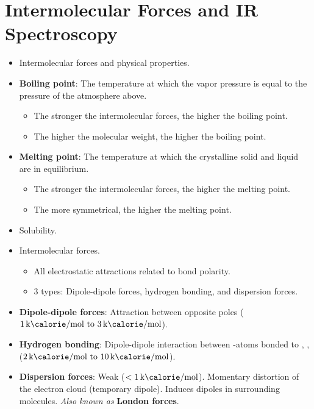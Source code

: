 \documentclass[../notes.tex]{subfiles}
\begin{document}
\section{Intermolecular Forces and IR Spectroscopy}
\begin{itemize}
    \item {}Intermolecular forces and physical properties.
    \item \textbf{Boiling point}: The temperature at which the vapor pressure is equal to the pressure of the atmosphere above.
    \begin{itemize}
        \item The stronger the intermolecular forces, the higher the boiling point.
        \item The higher the molecular weight, the higher the boiling point.
    \end{itemize}
    \item \textbf{Melting point}: The temperature at which the crystalline solid and liquid are in equilibrium.
    \begin{itemize}
        \item The stronger the intermolecular forces, the higher the melting point.
        \item The more symmetrical, the higher the melting point.
    \end{itemize}
    \item Solubility.
    \item Intermolecular forces.
    \begin{itemize}
        \item All electrostatic attractions related to bond polarity.
        \item 3 types: Dipole-dipole forces, hydrogen bonding, and dispersion forces.
    \end{itemize}
    \item \textbf{Dipole-dipole forces}: Attraction between opposite poles ($\SIrange[per-mode=symbol]{1}{3}{\kilo\calorie\per\mole}$).
    \item \textbf{Hydrogen bonding}: Dipole-dipole interaction between -atoms bonded to , ,  ($\SIrange[per-mode=symbol]{2}{10}{\kilo\calorie\per\mole}$).
    \item \textbf{Dispersion forces}: Weak ($<\SI[per-mode=symbol]{1}{\kilo\calorie\per\mole}$). Momentary distortion of the electron cloud (temporary dipole). Induces dipoles in surrounding molecules. \emph{Also known as} \textbf{London forces}.
    \begin{itemize}

\end{itemize}
\end{itemize}
\end{document}
